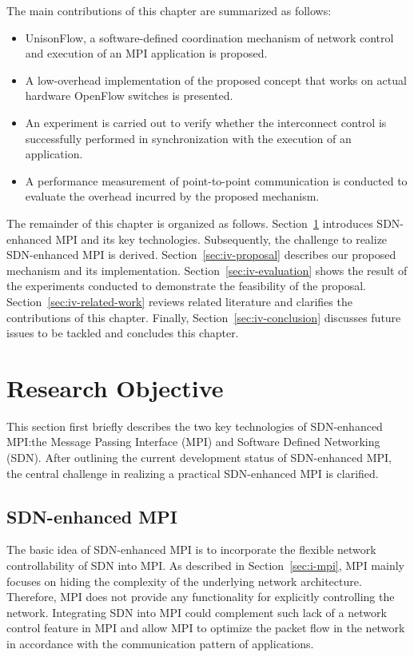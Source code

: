 The main contributions of this chapter are summarized as follows:

\begin{itemize}
\item
  UnisonFlow, a software-defined coordination mechanism of network
  control and execution of an MPI application is proposed.
\item
  A low-overhead implementation of the proposed concept that works on
  actual hardware OpenFlow switches is presented.
\item
  An experiment is carried out to verify whether the interconnect
  control is successfully performed in synchronization with the
  execution of an application.
\item
  A performance measurement of point-to-point communication is conducted
  to evaluate the overhead incurred by the proposed mechanism.
\end{itemize}

The remainder of this chapter is organized as follows.
Section~\ref{sec:iv-objective} introduces SDN-enhanced MPI and its key
technologies. Subsequently, the challenge to realize SDN-enhanced MPI is
derived. Section~\ref{sec:iv-proposal} describes our proposed mechanism and its
implementation. Section~\ref{sec:iv-evaluation} shows the result of the experiments
conducted to demonstrate the feasibility of the proposal.
Section~\ref{sec:iv-related-work} reviews related literature and clarifies the
contributions of this chapter. Finally, Section~\ref{sec:iv-conclusion} discusses
future issues to be tackled and concludes this chapter.

\section{Research Objective}\label{sec:iv-objective}

This section first briefly describes the two key technologies of
SDN-enhanced MPI:\@ the Message Passing Interface (MPI) and Software
Defined Networking (SDN). After outlining the current development status
of SDN-enhanced MPI, the central challenge in realizing a practical
SDN-enhanced MPI is clarified.

\subsection{SDN-enhanced MPI}\label{sec:iv-sdn-mpi}

The basic idea of SDN-enhanced MPI is to incorporate the flexible
network controllability of SDN into MPI\@. As described in
Section~\ref{sec:i-mpi}, MPI mainly focuses on hiding the
complexity of the underlying network architecture. Therefore, MPI does not
provide any functionality for explicitly controlling the network. Integrating
SDN into MPI could complement such lack of a network control feature in MPI
and allow MPI to optimize the packet flow in the network in accordance with
the communication pattern of applications.

